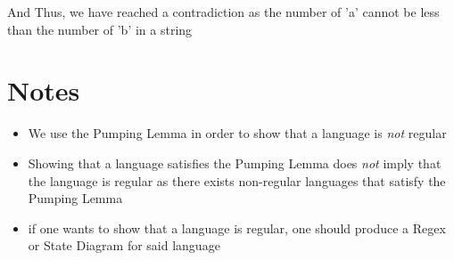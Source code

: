 \documentclass[12pt]{book}
\begin{document}
And Thus, we have reached a contradiction as the number of 'a' cannot be less than the number of 'b' in a string

\section*{Notes}
\begin{itemize}
        \item We use the Pumping Lemma in order to show that a language is \textit{not} regular
        \item Showing that a language satisfies the Pumping Lemma does \textit{not} imply that the language is regular 
                as there exists non-regular languages that satisfy the Pumping Lemma
        \item if one wants to show that a language is regular, one should produce a Regex or State Diagram for 
                said language
\end{itemize}
\end{document}
